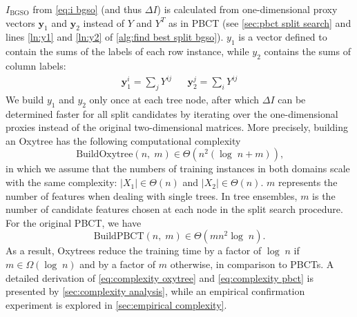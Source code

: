 \documentclass[sn-mathphys-num]{sn-jnl}%
\newcommand{\T}{^T}
\newcommand{\y}{\mathbf{y}}
\theoremstyle{thmstyleone}%
\theoremstyle{thmstyletwo}%
\theoremstyle{thmstylethree}%
\begin{document}
$I_\text{BGSO}$ from \autoref{eq:i bgso} (and thus $\Delta I$) is calculated from one-dimensional proxy vectors $\mathbf{y}_1$ and $\mathbf{y}_2$ instead of $Y$ and $Y\T$ as in PBCT (see \autoref{sec:pbct split search} and lines \ref{ln:y1} and \ref{ln:y2} of \autoref{alg:find best split bgso}).
%
$y_1$ is a vector defined to contain the sums of the labels of each row instance, while $y_2$ contains the sums of column labels:
%
\begin{align}
    \label{eq:proxies}
    \y_1^i = \sum_{j} Y^{ij}
    &&
    \y_2^j = \sum_{i} Y^{ij}  
\end{align}
%
We build $y_1$ and $y_2$ only once at each tree node, after which $\Delta I$ can be determined faster for all split candidates by iterating over the one-dimensional proxies instead of the original two-dimensional matrices. More precisely, building an Oxytree has
the following computational complexity
\begin{equation}
    \label{eq:complexity oxytree}
    \text{BuildOxytree}(n, \;  m) \in \Theta(n^2 (\log \; n + m))
    \text{,}
\end{equation}
in which we assume that the numbers of training instances in both domains scale with the same complexity: $|X_1| \in \Theta(n)$ and $|X_2| \in \Theta(n)$. $m$ represents the number of features when dealing with single trees. In tree ensembles, $m$ is the number of candidate features chosen at each node in the split search procedure. For the original PBCT, we have
\begin{equation}
    \label{eq:complexity pbct}
    \text{BuildPBCT}(n, \;  m) \in \Theta(m n^2 \log \; n)
    \text{.}
\end{equation}
As a result, Oxytrees reduce the training time by a factor of $\log \;n$  if $m \in \Omega(\log \;n)$ and by a factor of $m$ otherwise, in comparison to PBCTs. A detailed derivation of \autoref{eq:complexity oxytree} and \autoref{eq:complexity pbct} is presented by \autoref{sec:complexity analysis}, while an empirical confirmation experiment is explored in \autoref{sec:empirical complexity}.

\end{document}
